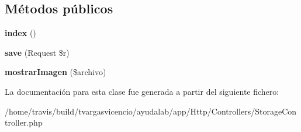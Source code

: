 \subsection*{\-Métodos públicos}
\begin{DoxyCompactItemize}
\item 
\hypertarget{class_app_1_1_http_1_1_controllers_1_1_storage_controller_a149eb92716c1084a935e04a8d95f7347}{{\bfseries index} ()}\label{class_app_1_1_http_1_1_controllers_1_1_storage_controller_a149eb92716c1084a935e04a8d95f7347}

\item 
\hypertarget{class_app_1_1_http_1_1_controllers_1_1_storage_controller_a5369f058d8c1c480e4d4775b8bc0a633}{{\bfseries save} (\-Request \$r)}\label{class_app_1_1_http_1_1_controllers_1_1_storage_controller_a5369f058d8c1c480e4d4775b8bc0a633}

\item 
\hypertarget{class_app_1_1_http_1_1_controllers_1_1_storage_controller_a945405d32516d2f5286c1fde68e17238}{{\bfseries mostrar\-Imagen} (\$archivo)}\label{class_app_1_1_http_1_1_controllers_1_1_storage_controller_a945405d32516d2f5286c1fde68e17238}

\end{DoxyCompactItemize}


\-La documentación para esta clase fue generada a partir del siguiente fichero\-:\begin{DoxyCompactItemize}
\item 
/home/travis/build/tvargasvicencio/ayudalab/app/\-Http/\-Controllers/\-Storage\-Controller.\-php\end{DoxyCompactItemize}
